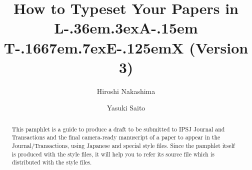 \makeatletter
\def\documentstyle[#1]#2{}
\def\thefootnote{\leavevmode\hbox{%
	\ifcase\c@footnote\or *\or **\or ***\else \thefootnotemany\fi}}
\def\thefootnotemany{\hbox{*\hskip\z@\number\c@footnote}}	%
\let\thefootnoteord\thefootnote

\setcounter{volume}{41}
\setcounter{number}{6}
\setcounter{volpageoffset}{1234}

\makeatletter
\let\@ARRAY\@array \def\@array{\def\<{\inhibitglue}\@ARRAY}
\def\<{\begingroup\(\langle\)\it}
\def\>{\/\(\rangle\)\endgroup}
\def\|{\verb|}
\def\cs#1{{\tt\string#1}}
\def\Underline{\setbox0\hbox\bgroup\let\\\endUnderline}
\def\endUnderline{\vphantom{y}\egroup\underline{\box0}\\}
\def\LATEx{\iLATEX{\normalsize\bf A}}
\def\LATex{\iLATEX{\small\bf A}}
\def\LaTeX{\leavevmode\smash{\iLATEX{\sc a}}}
\def\iLATEX#1{L\kern-.36em\raise.3ex\hbox{#1}\kern-.15em
    T\kern-.1667em\lower.7ex\hbox{E}\kern-.125emX}
\def\LATEXe{\ifx\LaTeXe\undefined \LaTeX 2e\else\LaTeXe\fi}
\def\LATExe{\ifx\LaTeXe\undefined \iLATEX\scriptsize 2e\else\LaTeXe\fi}
\def\Quote{\list{}{}\item[]}
\let\endQuote\endlist
\def\LDOTS{$\mathinner{\ldotp\ldotp\ldotp}$}

\title[How to Typeset Your Papers in {\protect\LaTeX}]%
	{How to Typeset Your Papers in {\protect\LATEx} (Version 3)}
\author{Hiroshi Nakashima\and
	Yasuki Saito}


\begin{abstract}
This pamphlet is a guide to produce a draft to be submitted to IPSJ Journal
and Transactions and the final camera-ready manuscript of a paper to appear
in the Journal\slash Transactions, using Japanese {\LaTeX} and special style
files.  Since the pamphlet itself is produced with the style files, it will
help you to refer its source file which is distributed with the style files.
\end{abstract}

